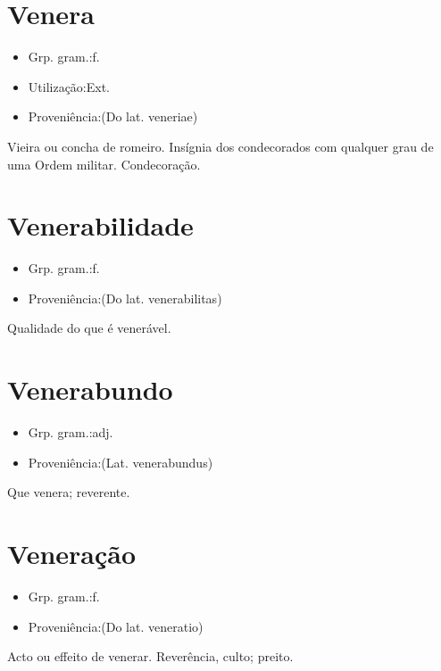 \documentclass{article}
\begin{document}
\section{Venera}
\begin{itemize}
\item {Grp. gram.:f.}
\end{itemize}
\begin{itemize}
\item {Utilização:Ext.}
\end{itemize}
\begin{itemize}
\item {Proveniência:(Do lat. \textunderscore veneriae\textunderscore )}
\end{itemize}
Vieira ou concha de romeiro.
Insígnia dos condecorados com qualquer grau de uma Ordem militar.
Condecoração.
\section{Venerabilidade}
\begin{itemize}
\item {Grp. gram.:f.}
\end{itemize}
\begin{itemize}
\item {Proveniência:(Do lat. \textunderscore venerabilitas\textunderscore )}
\end{itemize}
Qualidade do que é venerável.
\section{Venerabundo}
\begin{itemize}
\item {Grp. gram.:adj.}
\end{itemize}
\begin{itemize}
\item {Proveniência:(Lat. \textunderscore venerabundus\textunderscore )}
\end{itemize}
Que venera; reverente.
\section{Veneração}
\begin{itemize}
\item {Grp. gram.:f.}
\end{itemize}
\begin{itemize}
\item {Proveniência:(Do lat. \textunderscore veneratio\textunderscore )}
\end{itemize}
Acto ou effeito de venerar.
Reverência, culto; preito.
\end{document}
